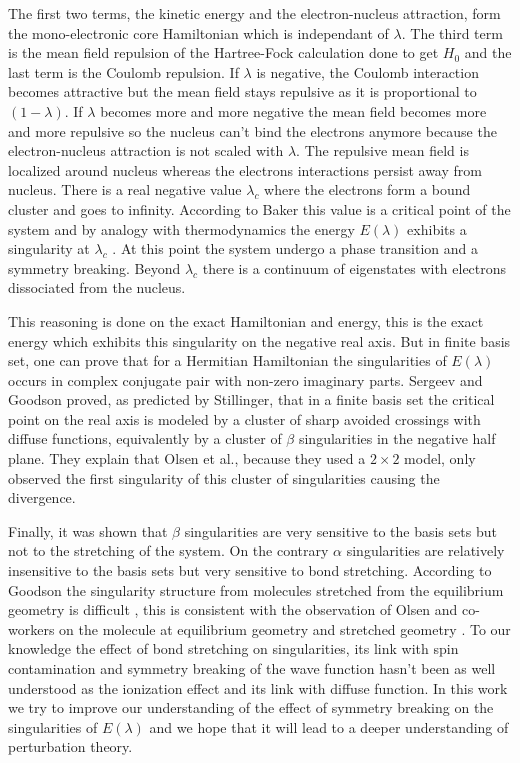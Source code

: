 \documentclass[11pt,a4paper]{article}
\begin{document}
{The first two terms, the kinetic energy and the electron-nucleus attraction, form the mono-electronic core Hamiltonian which is independant of $\lambda$. The third term is the mean field repulsion of the Hartree-Fock calculation done to get $H_0$ and the last term is the Coulomb repulsion. If $\lambda$ is negative, the Coulomb interaction becomes attractive but the mean field stays repulsive as it is proportional to $(1-\lambda)$. If $\lambda$ becomes more and more negative the mean field becomes more and more repulsive so the nucleus can't bind the electrons anymore because the electron-nucleus attraction is not scaled with $\lambda$. The repulsive mean field is localized around nucleus whereas the electrons interactions persist away from nucleus. There is a real negative value $\lambda_c$ where the electrons form a bound cluster and goes to infinity. According to Baker this value is a critical point of the system and by analogy with thermodynamics the energy $E(\lambda)$ exhibits a singularity at $\lambda_c$ \cite{Baker_1971}. At this point the system undergo a phase transition and a symmetry breaking. Beyond $\lambda_c$ there is a continuum of eigenstates with electrons dissociated from the nucleus.

This reasoning is done on the exact Hamiltonian and energy, this is the exact energy which exhibits this singularity on the negative real axis. But in finite basis set, one can prove that for a Hermitian Hamiltonian the singularities of $E(\lambda)$ occurs in complex conjugate pair with non-zero imaginary parts. Sergeev and Goodson proved, as predicted by Stillinger, that in a finite basis set the critical point on the real axis is modeled by a cluster of sharp avoided crossings with diffuse functions, equivalently by a cluster of $\beta$ singularities in the negative half plane. They explain that Olsen et al., because they used a $2\times2$ model, only observed the first singularity of this cluster of singularities causing the divergence.

Finally, it was shown that $\beta$ singularities are very sensitive to the basis sets but not to the stretching of the system. On the contrary $\alpha$ singularities are relatively insensitive to the basis sets but very sensitive to bond stretching. According to Goodson the singularity structure from molecules stretched from the equilibrium geometry is difficult \cite{Goodson_2004}, this is consistent with the observation of Olsen and co-workers on the  molecule at equilibrium geometry and stretched geometry \cite{Olsen_2000}. To our knowledge the effect of bond stretching on singularities, its link with spin contamination and symmetry breaking of the wave function hasn't been as well understood as the ionization effect and its link with diffuse function. In this work we try to improve our understanding of the effect of symmetry breaking on the singularities of $E(\lambda)$ and we hope that it will lead to a deeper understanding of perturbation theory.

}
\end{document}

